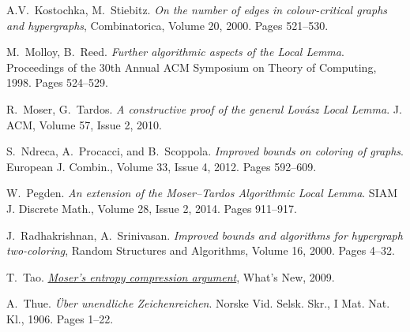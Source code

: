 \documentclass[10pt]{article}
\numberwithin{equation}{subsection}
\theoremstyle{definition}
\begin{document}
\begin{thebibliography}{99}
		 A.V.~Kostochka, M.~Stiebitz. \emph{On the number of edges in colour-critical graphs and hypergraphs}, Combinatorica, Volume 20, 2000. Pages 521--530. 
		
		 M.~Molloy, B.~Reed. \emph{Further algorithmic aspects of the Local Lemma}. Proceedings of the 30th Annual ACM Symposium on Theory of Computing, 1998. Pages 524--529.
		
		 R.~Moser, G.~Tardos. \emph{A constructive proof of the general Lov\'{a}sz Local Lemma}. J. ACM, Volume 57, Issue 2, 2010.
		
		 S.~Ndreca, A.~Procacci, and B.~Scoppola. \emph{Improved bounds on coloring of graphs}. European J. Combin., Volume 33, Issue 4, 2012. Pages 592--609.
		
		 W.~Pegden. \emph{An extension of the Moser--Tardos Algorithmic Local Lemma}. SIAM J. Discrete Math., Volume 28, Issue 2, 2014. Pages 911--917.
		
		 J.~Radhakrishnan, A.~Srinivasan. \emph{Improved bounds and algorithms for hypergraph
		two-coloring}, Random Structures and Algorithms, Volume 16, 2000. Pages 4--32.

		 T.~Tao. \href{https://terrytao.wordpress.com/2009/08/05/mosers-entropy-compression-argument/}{\emph{Moser's entropy compression argument}}, What's New, 2009.
		
		 A.~Thue. \emph{\"{U}ber unendliche Zeichenreichen}. Norske Vid. Selsk. Skr., I Mat. Nat. Kl., 1906. Pages 1--22.
		
	\end{thebibliography}			
	
	
\end{document}
